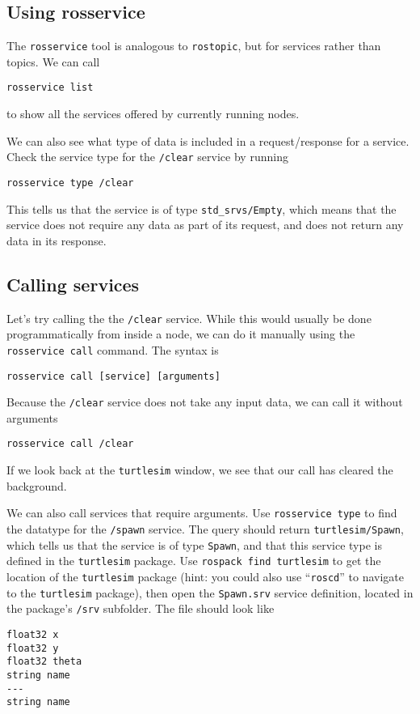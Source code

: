 \documentclass{article}
\begin{document}
\subsection{Using rosservice}
The \verb=rosservice= tool is analogous to \verb=rostopic=, but for services rather than topics. We can call
\begin{Verbatim}[frame=single]
rosservice list
\end{Verbatim}
to show all the services offered by currently running nodes.

We can also see what type of data is included in a request/response for a service. Check the service type for the \verb=/clear= service by running
\begin{Verbatim}[frame=single]
rosservice type /clear
\end{Verbatim}
This tells us that the service is of type \verb=std_srvs/Empty=, which means that the service does not require any data as part of its request, and does not return any data in its response.

\subsection{Calling services}
Let's try calling the the \verb=/clear= service. While this would usually be done programmatically from inside a node, we can do it manually using the \verb=rosservice call= command. The syntax is
\begin{Verbatim}[frame=single]
rosservice call [service] [arguments]
\end{Verbatim}

Because the \verb=/clear= service does not take any input data, we can call it without arguments
\begin{Verbatim}[frame=single]
rosservice call /clear
\end{Verbatim}
If we look back at the \verb=turtlesim= window, we see that our call has cleared the background.

We can also call services that require arguments. Use \verb=rosservice type= to find the datatype for the \verb=/spawn= service. The query should return \verb=turtlesim/Spawn=, which tells us that the service is of type \verb=Spawn=, and that this service type is defined in the \verb=turtlesim= package. Use \verb=rospack find turtlesim= to get the location of the \verb=turtlesim= package (hint: you could also use ``\verb=roscd='' to navigate to the \verb=turtlesim= package), then open the \verb=Spawn.srv= service definition, located in the package's \verb=/srv= subfolder. The file should look like
\begin{Verbatim}[frame=single]
float32 x
float32 y
float32 theta
string name
---
string name
\end{Verbatim}
\end{document}
